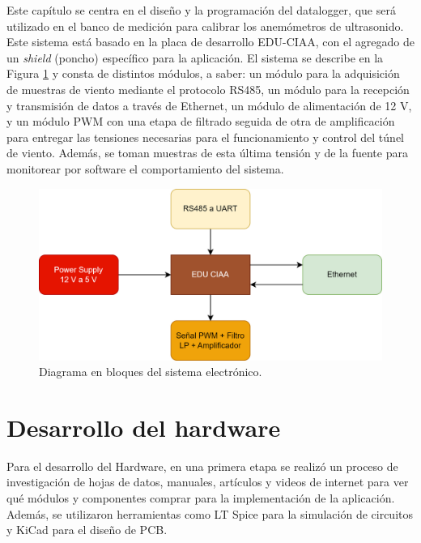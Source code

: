 Este capítulo se centra en el diseño y la programación del datalogger, que será utilizado en el banco de medición para calibrar los anemómetros de ultrasonido. Este sistema está basado en la placa de desarrollo EDU-CIAA, con el agregado de un \textit{shield} (poncho) específico para la aplicación. El sistema se describe en la Figura \ref{fig:esquemaHardware} y consta de distintos módulos, a saber: un módulo para la adquisición de muestras de viento mediante el protocolo RS485, un módulo para la recepción y transmisión de datos a través de Ethernet, un módulo de alimentación de 12 \unit{\volt}, y un módulo PWM con una etapa de filtrado seguida de otra de amplificación para entregar las tensiones necesarias para el funcionamiento y control del túnel de viento. Además, se toman muestras de esta última tensión y de la fuente para monitorear por software el comportamiento del sistema.


\begin{figure}[H]
    \centering
    \includegraphics[width=0.85\linewidth]{Figuras/datalogger/esquemaHardarware.png}
    \caption{Diagrama en bloques del sistema electrónico.}
    \label{fig:esquemaHardware}
\end{figure}




\section{Desarrollo del hardware}\label{sec:desarrolloHardware}


Para el desarrollo del Hardware, en una primera etapa se realizó un proceso de investigación de hojas de datos, manuales, artículos y videos de internet para ver qué módulos y componentes comprar para la implementación de la aplicación. Además, se utilizaron herramientas como LT Spice para la simulación de circuitos y KiCad para el diseño de PCB. 

